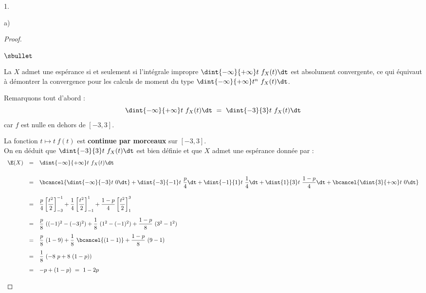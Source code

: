 \documentclass[11pt]{article}%
\begin{document}
\begin{noliste}{1.}
\begin{noliste}{a)}
    \begin{proof}~
      \begin{noliste}{$\sbullet$}
      \item La \var $X$ admet une espérance si et seulement si
        l'intégrale impropre $\dint{-\infty}{+\infty} t \ f_X(t) \dt$
        est absolument convergente, ce qui équivaut à démontrer la
        convergence pour les calculs de moment du type
        $\dint{-\infty}{+\infty} t^n \ f_X(t) \dt$.
      \item Remarquons tout d'abord :
        \[
        \dint{-\infty}{+\infty} t \ f_X(t) \dt \ = \ \dint{-3}{3} t \
        f_X(t) \dt
        \]
        car $f$ est nulle en dehors de $[-3, 3]$.

      \item La fonction $t \mapsto t \ f(t)$ est {\bf continue par
          morceaux} sur $[-3, 3]$.\\
        On en déduit que $\dint{-3}{3} t \ f_X(t) \dt$ est bien
        définie et que $X$ admet une espérance donnée par :
        \[
        \begin{array}{rcl}
          \E(X) %
          & = & \dint{-\infty}{+\infty} t \ f_X(t) \dt \\[.6cm]
          & = & \bcancel{\dint{-\infty}{-3} t \ 0 \dt} +
          \dint{-3}{-1}t\ \dfrac{p}{4}\dt + \dint{-1}{1}t\
          \dfrac{1}{4}\dt + \dint{1}{3}t\ \dfrac{1-p}{4}\dt +
          \bcancel{\dint{3}{+\infty} t \ 0 \dt} \\[.6cm]
          & = & \dfrac{p}{4}\left[ \dfrac{t^2}{2} \right]_{-3}^{-1}
          +\dfrac{1}{4}\left[ \dfrac{t^2}{2} \right]_{-1}^{1}
          +\dfrac{1-p}{4}\left[ \dfrac{t^2}{2} \right]_{1}^{3}
          \\[.6cm]
          & = & \dfrac{p}{8} \ ((-1)^2 - (-3)^2) + \dfrac{1}{8} \
          (1^2 - (-1)^2) + \dfrac{1-p}{8} \ (3^2 - 1^2) \\[.4cm]
          & = & \dfrac{p}{8} \ (1 - 9) + \dfrac{1}{8} \
          \bcancel{(1 - 1)} + \dfrac{1-p}{8} \ (9 - 1) 
          \\[.4cm]
          & = & \dfrac{1}{8} \ (-8 \ p + 8 \ (1-p))
          \\[.4cm]
          & = & -p + (1-p) \ = \ 1-2p
        \end{array}
        \]
        

\end{noliste}
\end{proof}
\end{noliste}
\end{noliste}
\end{document}

